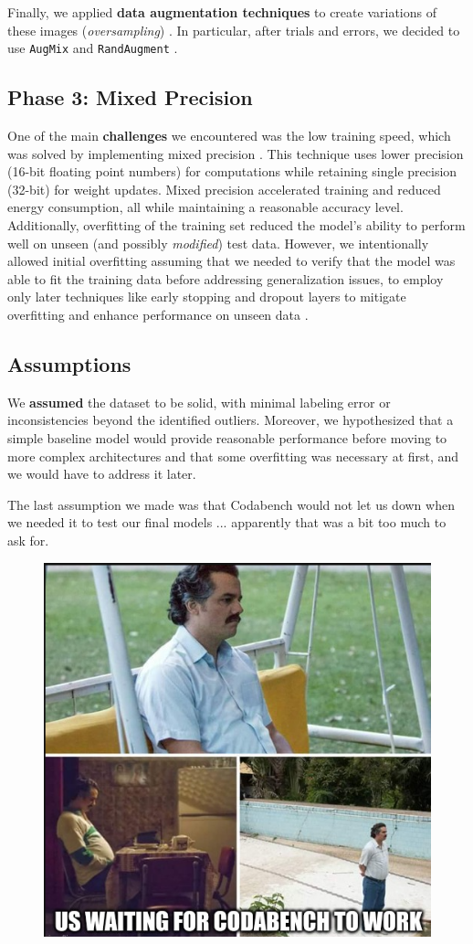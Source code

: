 \documentclass[11pt]{article}
\begin{document}
\begin{multicols*}{2}
        Finally, we applied \textbf{data augmentation techniques} to create variations of these images (\textit{oversampling}) \cite{oversampling}. In particular, after trials and errors, we decided to use \texttt{AugMix} and \texttt{RandAugment} \cite{aug}.

        \subsection{Phase 3: Mixed Precision}

        One of the main \textbf{challenges} we encountered was the low training speed, which was solved by implementing mixed precision \cite{mixed-precision}. This technique uses lower precision (16-bit floating point numbers) for computations while retaining single precision (32-bit) for weight updates. Mixed precision accelerated training and reduced energy consumption, all while maintaining a reasonable accuracy level. Additionally, overfitting of the training set reduced the model's ability to perform well on unseen (and possibly \textit{modified}) test data. However, we intentionally allowed initial overfitting assuming that we needed to verify that the model was able to fit the training data before addressing generalization issues, to employ only later techniques like early stopping and dropout layers to mitigate overfitting and enhance performance on unseen data \cite{overfitting}.

        \subsection{Assumptions}

        We \textbf{assumed} the dataset to be solid, with minimal labeling error or inconsistencies beyond the identified outliers. Moreover, we hypothesized that a simple baseline model would provide reasonable performance before moving to more complex architectures and that some overfitting was necessary at first, and we would have to address it later. 

        The last assumption we made was that Codabench would not let us down when we needed it to test our final models ... apparently that was a bit too much to ask for.

        \begin{figure}[H]
            \centering
            \includegraphics[width=0.3\linewidth]{meme/Screenshot from 2024-11-21 11-03-01.png}
        \end{figure}


\end{multicols*}
\end{document}
